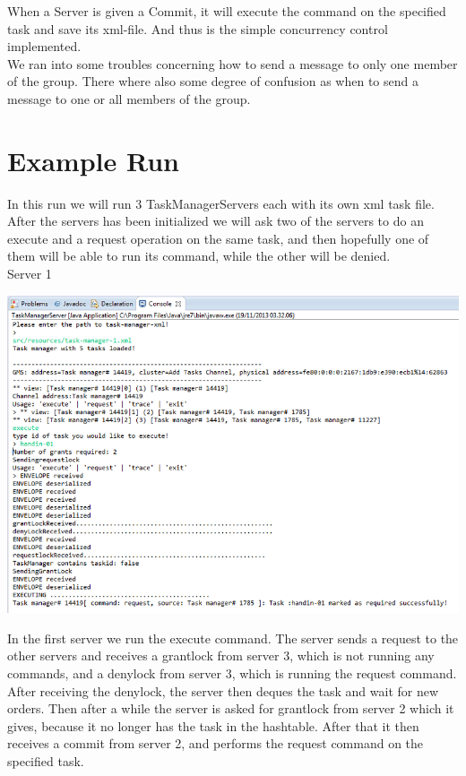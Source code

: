 When a Server is given a Commit, it will execute the command on the specified task and save its xml-file. And thus is the simple concurrency control implemented. \\

We ran into some troubles concerning how to send a message to only one member of the group. There where also some degree of confusion as when to send a message to one or all members of the group. \\


\section{Example Run}
\label{MutualExclusion_run}

In this run we will run 3 TaskManagerServers each with its own xml task file. After the servers has been initialized we will ask two of the servers to do an execute and a request operation on the same task, and then hopefully one of them will be able to run its command, while the other will be denied. \\

\caption{Server 1}
\includegraphics[scale=0.6]{images/CCServer1.png}

In the first server we run the execute command. The server sends a request to the other servers and receives a grantlock from server 3, which is not running any commands, and a denylock from server 3, which is running the request command. After receiving the denylock, the server then deques the task and wait for new orders. Then after a while the server is asked for grantlock from server 2 which it gives, because it no longer has the task in the hashtable. After that it then receives a commit from server 2, and performs the request command on the specified task. \\

